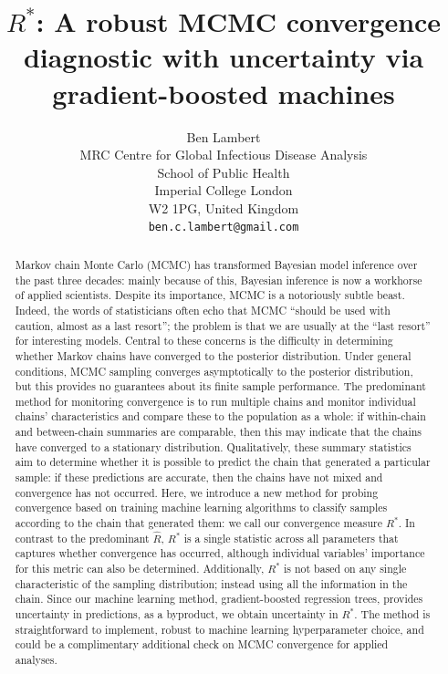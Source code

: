 \documentclass{article}
\title{$R^*$: A robust MCMC convergence diagnostic with uncertainty via gradient-boosted machines}
\author{%
	 Ben Lambert\\
	 MRC Centre for Global Infectious Disease Analysis\\
	 School of Public Health\\
	 Imperial College London\\
	 W2 1PG, United Kingdom\\
	 \texttt{ben.c.lambert@gmail.com} \\
}
\begin{document}

\maketitle

\begin{abstract}
	Markov chain Monte Carlo (MCMC) has transformed Bayesian model inference over the past three decades: mainly because of this, Bayesian inference is now a workhorse of applied scientists. Despite its importance, MCMC is a notoriously subtle beast. Indeed, the words of statisticians often echo that MCMC ``should be used with caution, almost as a last resort''; the problem is that we are usually at the ``last resort'' for interesting models. Central to these concerns is the difficulty in determining whether Markov chains have converged to the posterior distribution. Under general conditions, MCMC sampling converges asymptotically to the posterior distribution, but this provides no guarantees about its finite sample performance. The predominant method for monitoring convergence is to run multiple chains and monitor individual chains' characteristics and compare these to the population as a whole: if within-chain and between-chain summaries are comparable, then this may indicate that the chains have converged to a stationary distribution. Qualitatively, these summary statistics aim to determine whether it is possible to predict the chain that generated a particular sample: if these predictions are accurate, then the chains have not mixed and convergence has not occurred. Here, we introduce a new method for probing convergence based on training machine learning algorithms to classify samples according to the chain that generated them: we call our convergence measure $R^*$. In contrast to the predominant $\hat{R}$, $R^*$ is a single statistic across all parameters that captures whether convergence has occurred, although individual variables' importance for this metric can also be determined. Additionally, $R^*$ is not based on any single characteristic of the sampling distribution; instead using all the information in the chain. Since our machine learning method, gradient-boosted regression trees, provides uncertainty in predictions, as a byproduct, we obtain uncertainty in $R^*$. The method is straightforward to implement, robust to machine learning hyperparameter choice, and could be a complimentary additional check on MCMC convergence for applied analyses.
\end{abstract}
\end{document}
